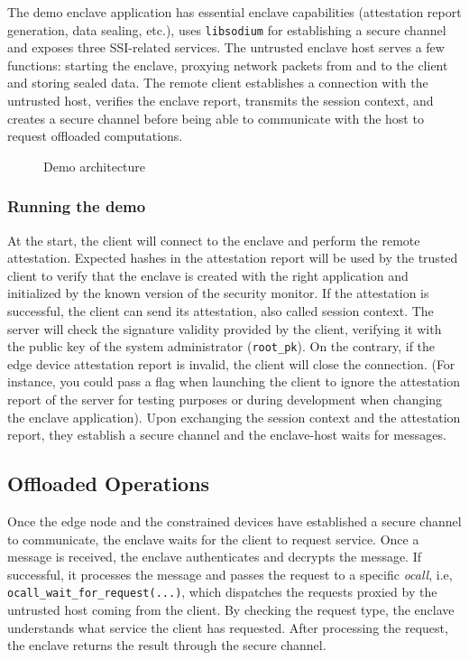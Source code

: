 The demo enclave application has essential enclave capabilities (attestation report generation, data sealing, etc.), uses \texttt{libsodium} for establishing a secure channel and exposes three SSI-related services. The untrusted enclave host serves a few functions: starting the enclave, proxying network packets from and to the client and storing sealed data. The remote client establishes a connection with the untrusted host, verifies the enclave report, transmits the session context, and creates a secure channel before being able to communicate with the host to request offloaded computations. 

\begin{figure}[!h]
    \centering
    
    \caption{Demo architecture}
    \label{poc-architecture}
\end{figure}

\subsubsection{Running the demo}

At the start, the client will connect to the enclave and perform the remote attestation. Expected hashes in the attestation report will be used by the trusted client to verify that the enclave is created with the right application and initialized by the known version of the security monitor. If the attestation is successful, the client can send its attestation, also called session context. The server will check the signature validity provided by the client, verifying it with the public key of the system administrator (\texttt{root\_pk}). On the contrary, if the edge device attestation report is invalid, the client will close the connection. (For instance, you could pass a flag when launching the client to ignore the attestation report of the server for testing purposes or during development when changing the enclave application).
Upon exchanging the session context and the attestation report, they establish a secure channel and the enclave-host waits for messages.

\subsection{Offloaded Operations}
Once the edge node and the constrained devices have established a secure channel to communicate, the enclave waits for the client to request service. Once a message is received, the enclave authenticates and decrypts the message. If successful, it processes the message and passes the request to a specific \textit{ocall}, i.e, \texttt{ocall\_wait\_for\_request(...)}, which dispatches the requests proxied by the untrusted host coming from the client. By checking the request type, the enclave understands what service the client has requested. After processing the request, the enclave returns the result through the secure channel.

